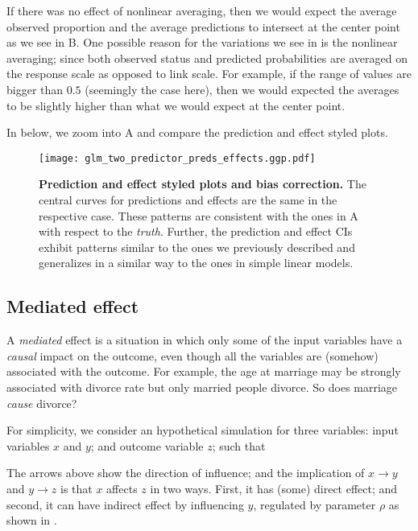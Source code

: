 If there was no effect of nonlinear averaging, then we would expect the average observed proportion and the average predictions to intersect at the center point as we see in B. One possible reason for the variations we see in  is the nonlinear averaging; since both observed status and predicted probabilities are averaged on the response scale as opposed to link scale. For example, if the range of values are bigger than $0.5$ (seemingly the case here), then we would expected the averages to be slightly higher than what we would expect at the center point.

In  below, we zoom into A and compare the prediction and effect styled plots. 

\begin{figure}
\begin{center}
\texttt{[image: glm\_two\_predictor\_preds\_effects.ggp.pdf]}
\end{center}
\caption{{\bf Prediction and effect styled plots and bias correction.} The central curves for predictions and effects are the same in the respective case. These patterns are  consistent with the ones in A with respect to the \emph{truth}. Further, the prediction and effect CIs exhibit patterns similar to the ones we previously described and generalizes in a similar way to the ones in simple linear models.
}
\label{fig:pred_bin_prediction_effects_plots}
\end{figure}


\subsection{Mediated effect}

A \emph{mediated} effect is a situation in which only some of the input variables have a \emph{causal} impact on the outcome, even though all the variables are (somehow) associated with the outcome. For example, the age at marriage may be strongly associated with divorce rate but only married people divorce. So does marriage \emph{cause} divorce?

For simplicity, we consider an hypothetical simulation for three variables: input variables $x$ and $y$; and outcome variable $z$; such that
%
\begin{center}
\end{center}
%
The arrows above show the direction of influence; and the implication of $x\rightarrow y$ and $y \rightarrow z$ is that $x$ affects $z$ in two ways. First, it has (some) direct effect; and second, it can have indirect effect by influencing $y$, regulated by parameter $\rho$ as shown in .


